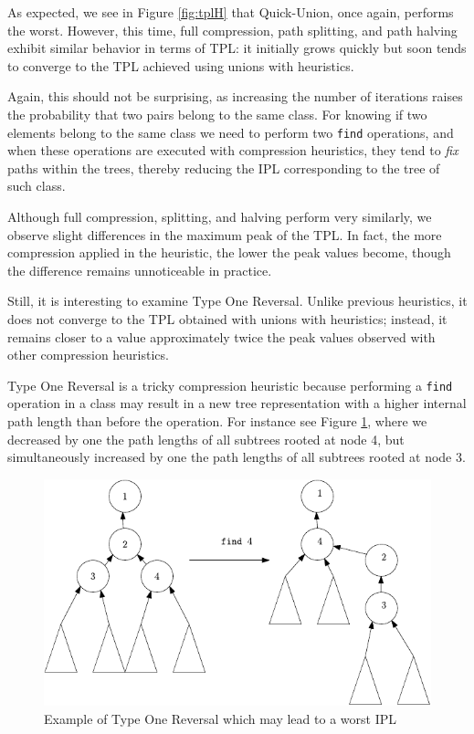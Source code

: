 As expected, we see in Figure \ref{fig:tplH} that Quick-Union, once again, performs the worst. However, this time, full compression, path splitting, and path halving exhibit similar behavior in terms of TPL: it initially grows quickly but soon tends to converge to the TPL achieved using unions with heuristics.  

Again, this should not be surprising, as increasing the number of iterations raises the probability that two pairs belong to the same class. For knowing if two elements belong to the same class we need to perform two \texttt{find} operations, and when these operations are executed with compression heuristics, they tend to \textit{fix} paths within the trees, thereby reducing the IPL corresponding to the tree of such class.

Although full compression, splitting, and halving perform very similarly, we observe slight differences in the maximum peak of the TPL. In fact, the more compression applied in the heuristic, the lower the peak values become, though the difference remains unnoticeable in practice.

Still, it is interesting to examine Type One Reversal. Unlike previous heuristics, it does not converge to the TPL obtained with unions with heuristics; instead, it remains closer to a value approximately twice the peak values observed with other compression heuristics.  

Type One Reversal is a tricky compression heuristic because performing a \texttt{find} operation in a class may result in a new tree representation with a higher internal path length than before the operation. For instance see Figure \ref{fig:torIPL}, where we decreased by one the path lengths of all subtrees rooted at node 4, but simultaneously increased by one the path lengths of all subtrees rooted at node 3.  


\begin{figure}[ht]
    \centering
    \includegraphics[scale=0.95]{../images/tor.pdf}
    \caption{Example of Type One Reversal which may lead to a worst IPL}
    \label{fig:torIPL}
\end{figure}

